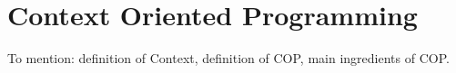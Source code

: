 \section{Context Oriented Programming}
To mention: definition of Context, definition of COP, main ingredients of COP.